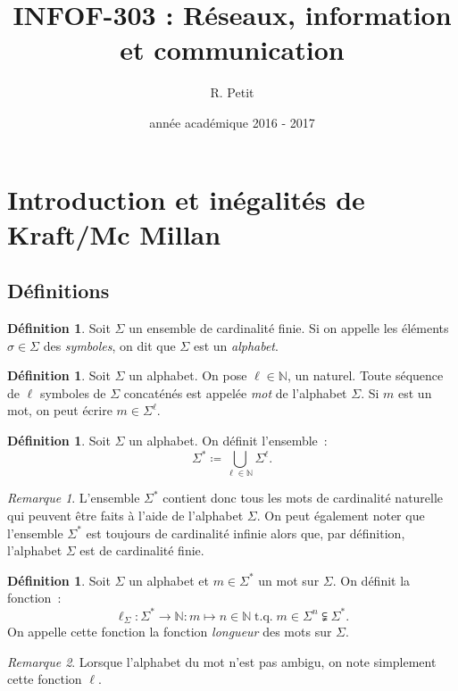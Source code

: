 \documentclass{article}
\title{INFOF-303 : Réseaux, information et communication}
\author{R. Petit}
\date{année académique 2016 - 2017}
\DeclareMathOperator{\tq}{\text{ t.q. }}
\newcommand{\N}{\mathbb N}
\theoremstyle{definition}
\newtheorem{déf}[thm]{Définition}
\theoremstyle{remark}
\newtheorem*{rmq}{Remarque}
\begin{document}
\maketitle
\tableofcontents
\newpage
\setcounter{page}{1}

\section{Introduction et inégalités de Kraft/Mc Millan}
	\subsection{Définitions}
		\begin{déf} Soit $\Sigma$ un ensemble de cardinalité finie. Si on appelle les éléments $\sigma \in \Sigma$ des \textit{symboles},
		on dit que $\Sigma$ est un \textit{alphabet}. \end{déf}

		\begin{déf} Soit $\Sigma$ un alphabet. On pose $\ell \in \N$, un naturel. Toute séquence de $\ell$ symboles de $\Sigma$ concaténés est appelée
		\textit{mot} de l'alphabet $\Sigma$. Si $m$ est un mot, on peut écrire $m \in \Sigma^\ell$. \end{déf}

		\begin{déf} Soit $\Sigma$ un alphabet. On définit l'ensemble~:
		\[\Sigma^{*} \coloneqq \bigcup_{\ell \in \N}\Sigma^\ell.\]
		\end{déf}

		\begin{rmq} L'ensemble $\Sigma^{*}$ contient donc tous les mots de cardinalité naturelle qui peuvent être faits à l'aide de l'alphabet $\Sigma$.
		On peut également noter que l'ensemble $\Sigma^*$ est toujours de cardinalité infinie alors que, par définition, l'alphabet $\Sigma$ est de
		cardinalité finie. \end{rmq}

		\begin{déf} Soit $\Sigma$ un alphabet et $m \in \Sigma^*$ un mot sur $\Sigma$. On définit la fonction~:
		\[\ell_\Sigma : \Sigma^* \to \N : m \mapsto n \in \N \tq m \in \Sigma^n \subsetneqq \Sigma^*.\]
		On appelle cette fonction la fonction \textit{longueur} des mots sur $\Sigma$. \end{déf}

		\begin{rmq} Lorsque l'alphabet du mot n'est pas ambigu, on note simplement cette fonction $\ell$. \end{rmq}
\end{document}
